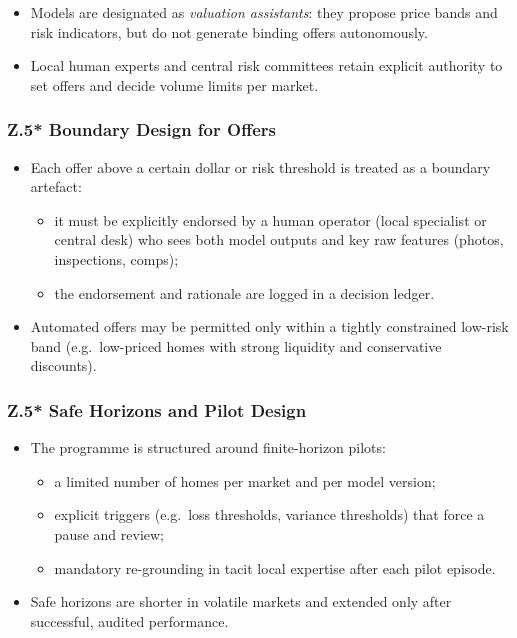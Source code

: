 \begin{itemize}
  \item Models are designated as \emph{valuation assistants}:
        they propose price bands and risk indicators, but do not generate
        binding offers autonomously.
  \item Local human experts and central risk committees retain explicit
        authority to set offers and decide volume limits per market.
\end{itemize}

\subsubsection*{Z.5* Boundary Design for Offers}

\begin{itemize}
  \item Each offer above a certain dollar or risk threshold is treated as a
        boundary artefact:
        \begin{itemize}
          \item it must be explicitly endorsed by a human operator (local
                specialist or central desk) who sees both model outputs and
                key raw features (photos, inspections, comps);
          \item the endorsement and rationale are logged in a decision ledger.
        \end{itemize}
  \item Automated offers may be permitted only within a tightly constrained
        low-risk band (e.g.\ low-priced homes with strong liquidity and
        conservative discounts).
\end{itemize}

\subsubsection*{Z.5* Safe Horizons and Pilot Design}

\begin{itemize}
  \item The programme is structured around finite-horizon pilots:
        \begin{itemize}
          \item a limited number of homes per market and per model version;
          \item explicit triggers (e.g.\ loss thresholds, variance thresholds)
                that force a pause and review;
          \item mandatory re-grounding in tacit local expertise after each
                pilot episode.
        \end{itemize}
  \item Safe horizons are shorter in volatile markets and extended only after
        successful, audited performance.
\end{itemize}


